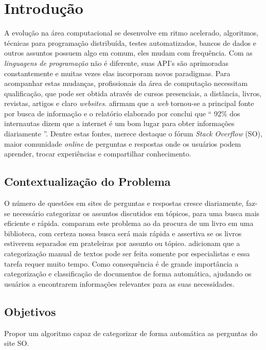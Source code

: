 \documentclass[10pt,a4paper,final]{article}
\begin{document}
    \folhaDeRosto

    \plano
    
    \section{Introdução}
    
A evolução na área computacional se desenvolve em ritmo acelerado, algoritmos, técnicas para programação distribuída, testes automatizados, bancos de dados e outros assuntos possuem algo em comum, eles mudam com frequência. Com as \emph{linguagens de programação} não é diferente, suas API's são aprimoradas constantemente e muitas vezes elas incorporam novos paradigmas. Para acompanhar estas mudanças, profissionais da área de computação necessitam qualificação, que pode ser obtida através de cursos presenciais, a distância, livros, revistas, artigos e claro \textit{websites}. \cite{Manning2009} afirmam que a \textit{web} tornou-se a principal fonte por busca de informação e o relatório elaborado por \cite{Fallows} conclui que \enquote{ 92\% dos internautas dizem que a internet é um bom lugar para obter informações diariamente }.
Dentre estas fontes, merece destaque o fórum \textit{Stack Overflow} (SO), maior comunidade \textit{online} de perguntas e respostas onde os usuários podem aprender, trocar experiências e compartilhar conhecimento.
    
    \subsection{Contextualização do Problema}
O número de questões em sites de perguntas e respostas cresce diariamente, faz-se necessário categorizar os assuntos discutidos em tópicos, para uma busca mais eficiente e rápida. \cite{Manning2009} comparam este problema ao da procura de um livro em uma biblioteca, com certeza nossa busca será mais rápida e assertiva se os livros estiverem separados em prateleiras por assunto ou tópico. \cite{Yasotha2016} adicionam que a categorização manual de textos pode ser feita somente por especialistas e essa tarefa requer muito tempo. Como consequência é de grande importância a categorização e classificação de documentos de forma automática, ajudando os usuários a encontrarem informações relevantes para as suas necessidades.

    \subsection{Objetivos}
Propor um algoritmo capaz de categorizar de forma automática as perguntas do site SO.
\end{document}
